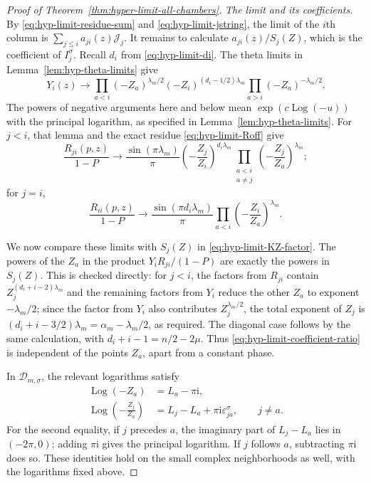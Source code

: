 \documentclass[12pt]{amsart}
\theoremstyle{definition}
\numberwithin{equation}{section}
\theoremstyle{definition}
\let\mc\mathcal
\let\eps\varepsilon
\let\si\sigma
\let\le\leqslant
\def\beq{\begin{equation}}
\def\eeq{\end{equation}}
\begin{document}
\begin{proof}[Proof of Theorem~\ref{thm:hyper-limit-all-chambers}]
\noindent\emph{The limit and its coefficients.}
By \eqref{eq:hyp-limit-residue-sum} and
\eqref{eq:hyp-limit-jstring}, the limit of the $i$th column is
$\sum_{j\le i}a_{ji}(z)\mc J_j$. It remains to calculate
$a_{ji}(z)/S_j(Z)$, which is the coefficient of $I_j^\si$.
Recall $d_i$ from \eqref{eq:hyp-limit-di}.
The theta limits in Lemma~\ref{lem:hyp-theta-limits}
give
\beq\label{eq:hyp-limit-Y-limit}
 Y_i(z)\longrightarrow
 \prod_{a<i}(-Z_a)^{\lambda_m/2}
 (-Z_i)^{(d_i-1/2)\lambda_m}
 \prod_{a>i}(-Z_a)^{-\lambda_m/2}.
\eeq
The powers of negative arguments here and below mean
$\exp(c\operatorname{Log}(-u))$ with the principal logarithm,
as specified in Lemma~\ref{lem:hyp-theta-limits}.
For $j<i$, that lemma and the exact residue
\eqref{eq:hyp-limit-Roff} give
\beq\label{eq:hyp-limit-Roff-limit}
 \frac{R_{ji}(p,z)}{1-P}\longrightarrow
 \frac{\sin(\pi\lambda_m)}{\pi}
 \left(-\frac{Z_j}{Z_i}\right)^{d_i\lambda_m}
 \prod_{\substack{a<i\\a\ne j}}
 \left(-\frac{Z_j}{Z_a}\right)^{\lambda_m};
\eeq
for $j=i$,
\beq\label{eq:hyp-limit-Rdiag-limit}
 \frac{R_{ii}(p,z)}{1-P}\longrightarrow
 \frac{\sin(\pi d_i\lambda_m)}{\pi}
 \prod_{a<i}\left(-\frac{Z_i}{Z_a}\right)^{\lambda_m}.
\eeq

We now compare these limits with $S_j(Z)$ in
\eqref{eq:hyp-limit-KZ-factor}.  The powers of the
$Z_a$ in the product
$Y_iR_{ji}/(1-P)$ are exactly the powers in $S_j(Z)$.
This is checked directly: for $j<i$, the factors from
$R_{ji}$ contain $Z_j^{(d_i+i-2)\lambda_m}$ and
the remaining factors from $Y_i$ reduce the other
$Z_a$ to exponent $-\lambda_m/2$; since the factor from $Y_i$ also contributes
$Z_j^{\lambda_m/2}$, the total exponent of $Z_j$ is
$(d_i+i-3/2)\lambda_m
 =\alpha_m-\lambda_m/2$, as required.  The diagonal
case follows by the same calculation, with
$d_i+i-1=n/2-2\mu$.
Thus \eqref{eq:hyp-limit-coefficient-ratio} is independent
of the points $Z_a$, apart from a constant phase.

In $\mc D_{m,\si}$, the relevant logarithms satisfy
\beq\label{eq:hyp-limit-branch-logs-sigma}
 \begin{aligned}
 \operatorname{Log}(-Z_a)&=L_a-\pi\mathrm{i},\\
 \operatorname{Log}\left(-\frac{Z_j}{Z_a}\right)
 &=L_j-L_a+\pi\mathrm{i}\eps_{ja}^\si,\qquad j\ne a.
 \end{aligned}
\eeq
For the second equality, if $j$ precedes $a$, the imaginary part
of $L_j-L_a$ lies in $(-2\pi,0)$; adding $\pi\mathrm{i}$ gives
the principal logarithm. If $j$ follows $a$, subtracting
$\pi\mathrm{i}$ does so. These identities hold on the small
complex neighborhoods as well, with the logarithms fixed above.


\end{proof}
\end{document}
